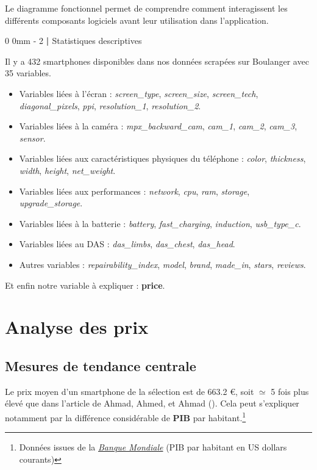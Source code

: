\documentclass[
  12pt,
]{report}
\makeatletter
\renewcommand{\chapter}{%
    \clearpage %
    \@startsection{chapter}%
    {0} %
    {0mm} %
    {-\baselineskip} %
    {2\baselineskip} %
    {\normalfont\Huge\bfseries | \Huge\bfseries}%
}
\makeatother
\begin{document}
Le diagramme fonctionnel permet de comprendre comment interagissent les
différents composants logiciels avant leur utilisation dans
l'application.

\chapter{Statistiques descriptives}\label{statistiques-descriptives}

Il y a 432 smartphones disponibles dans nos données scrapées sur
Boulanger avec 35 variables.

\begin{itemize}
\item
  Variables liées à l'écran : \emph{screen\_type}, \emph{screen\_size},
  \emph{screen\_tech}, \emph{diagonal\_pixels}, \emph{ppi},
  \emph{resolution\_1}, \emph{resolution\_2}.
\item
  Variables liées à la caméra : \emph{mpx\_backward\_cam},
  \emph{cam\_1}, \emph{cam\_2}, \emph{cam\_3}, \emph{sensor}.
\item
  Variables liées aux caractéristiques physiques du téléphone :
  \emph{color}, \emph{thickness}, \emph{width}, \emph{height},
  \emph{net\_weight}.
\item
  Variables liées aux performances : \emph{network}, \emph{cpu},
  \emph{ram}, \emph{storage}, \emph{upgrade\_storage}.
\item
  Variables liées à la batterie : \emph{battery}, \emph{fast\_charging},
  \emph{induction}, \emph{usb\_type\_c}.
\item
  Variables liées au DAS : \emph{das\_limbs}, \emph{das\_chest},
  \emph{das\_head}.
\item
  Autres variables : \emph{repairability\_index}, \emph{model},
  \emph{brand}, \emph{made\_in}, \emph{stars}, \emph{reviews}.
\end{itemize}

Et enfin notre variable à expliquer : \textbf{price}.

\section{Analyse des prix}\label{analyse-des-prix}

\subsection{Mesures de tendance
centrale}\label{mesures-de-tendance-centrale}

Le prix moyen d'un smartphone de la sélection est de 663.2 €, soit
\(\simeq\) 5 fois plus élevé que dans l'article de Ahmad, Ahmed, et
Ahmad (). Cela peut s'expliquer notamment
par la différence considérable de \textbf{PIB} par habitant.\footnote{Données
  issues de la
  \href{https://donnees.banquemondiale.org/indicator/NY.GDP.PCAP.CD?most_recent_year_desc=true}{\emph{Banque
  Mondiale}} (PIB par habitant en US dollars courants)}
\end{document}
